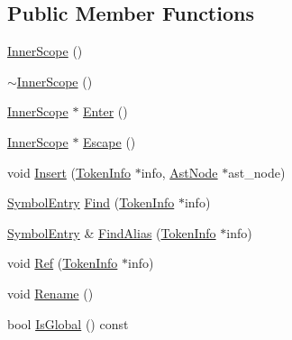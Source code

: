 \subsection*{Public Member Functions}
\begin{DoxyCompactItemize}
\item 
\hyperlink{classmocha_1_1_inner_scope_acef59a2a209c2bb518d3031f137153e7}{InnerScope} ()
\item 
\hyperlink{classmocha_1_1_inner_scope_adea81ca72fcc6ae140def0747ad208fc}{$\sim$InnerScope} ()
\item 
\hyperlink{classmocha_1_1_inner_scope}{InnerScope} $\ast$ \hyperlink{classmocha_1_1_inner_scope_abe25ae4283f98837e351f1423d1863b4}{Enter} ()
\item 
\hyperlink{classmocha_1_1_inner_scope}{InnerScope} $\ast$ \hyperlink{classmocha_1_1_inner_scope_a62aca280fa56be2ea5e29d96de3391d2}{Escape} ()
\item 
void \hyperlink{classmocha_1_1_inner_scope_a1551e762de57c7df1b7a75a741587090}{Insert} (\hyperlink{classmocha_1_1_token_info}{TokenInfo} $\ast$info, \hyperlink{classmocha_1_1_ast_node}{AstNode} $\ast$ast\_\-node)
\item 
\hyperlink{namespacemocha_a692c3ca38973da32760e114599b8a960}{SymbolEntry} \hyperlink{classmocha_1_1_inner_scope_aee9224b92b1b1f0611196c8793892420}{Find} (\hyperlink{classmocha_1_1_token_info}{TokenInfo} $\ast$info)
\item 
\hyperlink{namespacemocha_a692c3ca38973da32760e114599b8a960}{SymbolEntry} \& \hyperlink{classmocha_1_1_inner_scope_a38982db3d26d1f1d0fd319dcefde9607}{FindAlias} (\hyperlink{classmocha_1_1_token_info}{TokenInfo} $\ast$info)
\item 
void \hyperlink{classmocha_1_1_inner_scope_a550ca05e509421d0d91c017d550e4a30}{Ref} (\hyperlink{classmocha_1_1_token_info}{TokenInfo} $\ast$info)
\item 
void \hyperlink{classmocha_1_1_inner_scope_a1131ce33684508e3ff86fe230bfc8377}{Rename} ()
\item 
bool \hyperlink{classmocha_1_1_inner_scope_a55cc6698288ec95e2d9650038280dee7}{IsGlobal} () const 
\end{DoxyCompactItemize}
